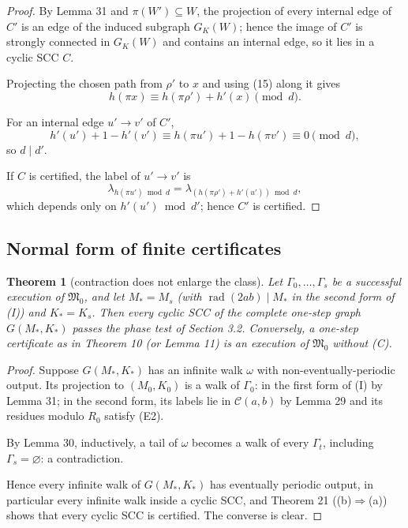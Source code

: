 \documentclass[11pt,reqno]{amsart}
\newtheorem{theorem}{Theorem}
\theoremstyle{definition}
\theoremstyle{remark}
\begin{document}
\begin{proof}\leavevmode\label{proof:32}
By Lemma 31 and \(\pi(W')\subseteq W\), the projection of
every internal edge of \(C'\) is an edge of the induced subgraph
\(G_K(W)\); hence the image of \(C'\) is strongly connected in
\(G_K(W)\) and contains an internal edge, so it lies in a cyclic SCC
\(C\).

Projecting the chosen
path from \(\rho'\) to \(x\) and using (15) along it gives
\[
h(\pi x)\equiv h(\pi\rho')+h'(x)\pmod d.
\]

For an internal edge
\(u'\to v'\) of \(C'\),
\[
h'(u')+1-h'(v')\equiv h(\pi u')+1-h(\pi v')
\equiv0\pmod d,
\]
so \(d\mid d'\).

If \(C\) is certified, the label of
\(u'\to v'\) is
\[
\lambda_{h(\pi u')\bmod d}
=\lambda_{(h(\pi\rho')+h'(u'))\bmod d},
\]
which depends only on
\(h'(u')\bmod d'\); hence \(C'\) is certified. \qedhere
\end{proof}

\subsection{Normal form of finite certificates}\label{sec:7.4}

\begin{samepage}
\begin{theorem}[contraction does not enlarge the class]\leavevmode\label{thm:33}
Let
\(\Gamma_0,\ldots,\Gamma_s\) be a successful execution of
\(\mathfrak M_0\), and let \(M_*=M_s\) (with
\(\operatorname{rad}(2ab)\mid M_*\) in the second form of (I)) and
\(K_*=K_s\). Then every cyclic SCC of the complete one-step graph
\(G(M_*,K_*)\) passes the phase test of Section 3.2. Conversely, a
one-step certificate as in Theorem 10 (or Lemma 11) is an execution of
\(\mathfrak M_0\) without (C).
\label{thm-end:33}
\end{theorem}
\end{samepage}

\begin{proof}\leavevmode\label{proof:33}
Suppose \(G(M_*,K_*)\) has an infinite walk \(\omega\) with
non-eventually-periodic output. Its projection to \((M_0,K_0)\) is a walk
of \(\Gamma_0\): in the first form of (I) by Lemma 31; in the second
form, its labels lie in \(\mathcal C(a,b)\) by Lemma 29 and its residues
modulo \(R_0\) satisfy (E2).

By Lemma 30, inductively, a tail of
\(\omega\) becomes a walk of every \(\Gamma_t\), including
\(\Gamma_s=\varnothing\): a contradiction.

Hence every infinite walk of
\(G(M_*,K_*)\) has eventually periodic output, in particular every
infinite walk inside a cyclic SCC, and Theorem 21 ((b)\(\Rightarrow\)(a)) shows that
every cyclic SCC is certified. The converse is clear. \qedhere
\end{proof}
\end{document}
